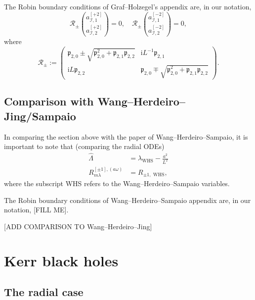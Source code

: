 \documentclass[11pt]{article}
\newcommand{\ii}{\mathrm{i}}
\newcommand{\cI}{\mathcal I}
\numberwithin{equation}{section}
\begin{document}
The Robin boundary conditions of Graf--Holzegel's appendix are, in our notation,
\[
\mathcal R_\pm
\binom{a_{\cI,1}^{[+2]}}{a_{\cI,2}^{[+2]}}
=0, \quad \mathcal R_\pm
\binom{a_{\cI,1}^{[-2]}}{a_{\cI,2}^{[-2]}}
=0,
\]
where
\[
\mathcal R_\pm
:=
\begin{pmatrix}
\mathfrak p_{2,0}\pm\sqrt{\mathfrak p_{2,0}^2+\mathfrak p_{2,1}\mathfrak p_{2,2}}
&
\ii L^{-1}\mathfrak p_{2,1}
\\
\ii L\mathfrak p_{2,2}
&
\mathfrak p_{2,0}\mp\sqrt{\mathfrak p_{2,0}^2+\mathfrak p_{2,1}\mathfrak p_{2,2}}
\end{pmatrix}.
\]

\subsection{Comparison with Wang--Herdeiro--Jing/Sampaio}

In comparing the section above with the paper of  Wang--Herdeiro--Sampaio, it is important to note that (comparing the radial ODEs) 
\begin{align*}
\hat\Lambda&=\lambda_{\text{WHS}}-\frac{a^2}{L^2}\\
R_{m\lambda}^{[\pm 1],(a\omega)}&= R_{\pm 1, \text{~WHS}},
\end{align*}
where the subscript WHS refers to the Wang--Herdeiro--Sampaio variables.

The Robin boundary conditions of Wang--Herdeiro--Sampaio appendix are, in our notation, [FILL ME].

[ADD COMPARISON TO Wang--Herdeiro--Jing]

\section{Kerr black holes}



\subsection{The radial case}
\end{document}
